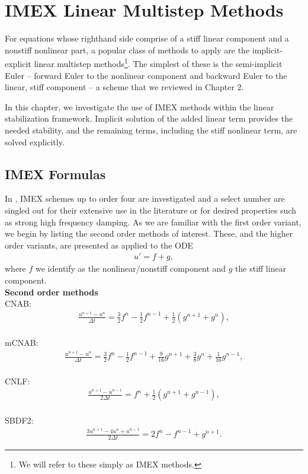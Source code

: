 \chapter{IMEX Linear Multistep Methods}
For equations whose righthand side comprise of a stiff linear component and a nonstiff nonlinear part, a popular class of methods to apply are the implicit-explicit linear multistep methods\footnote{We will refer to these simply as IMEX methods.}. The simplest of these is the semi-implicit Euler -- forward Euler to the nonlinear component and backward Euler to the linear, stiff component -- a scheme that we reviewed in Chapter 2. 

In this chapter, we investigate the use of IMEX methods within the linear stabilization framework. Implicit solution of the added linear term provides the needed stability, and the remaining terms, including the stiff nonlinear term, are solved explicitly.

\section{IMEX Formulas}
In \cite{ascher1995implicit}, IMEX schemes up to order four are investigated and a select number are singled out for their extensive use in the literature or for desired properties such as strong high frequency damping. As we are familiar with the first order variant, we begin by listing the second order methods of interest. These, and the higher order variants, are presented as applied to the ODE 
\begin{align*}
u' = f + g, 
\end{align*}
where $f$ we identify as the nonlinear/nonstiff component and $g$ the stiff linear component. 
\\ \noindent
\textbf{Second order methods}\\
CNAB:
\begin{align}
\frac{u^{n+1}-u^n}{\Delta t} 
= \frac{3}{2} f^n - \frac{1}{2}f^{n-1} 
+ \frac{1}{2}(g^{n+1} + g^n), 
\label{cnab}
\end{align}\\
mCNAB:
\begin{align}
\frac{u^{n+1}-u^n}{\Delta t} 
= \frac{3}{2}f^n - \frac{1}{2} f^{n-1}
+ \frac{9}{16}g^{n+1} 
+ \frac{3}{8}g^n
+ \frac{1}{16}g^{n-1},
\label{mcnab}
\end{align}
\\
CNLF:
\begin{align}
\frac{u^{n+1}-u^{n-1}}{2\Delta t}
= f^n + \frac{1}{2}(g^{n+1} + g^{n-1}),
\label{cnlf}
\end{align} \\
SBDF2:
\begin{align}
\frac{3u^{n+1}-4u^n+u^{n-1}}{2\Delta t} 
= 2f^n - f^{n-1} + g^{n+1}.
\label{sbdf2}
\end{align}

